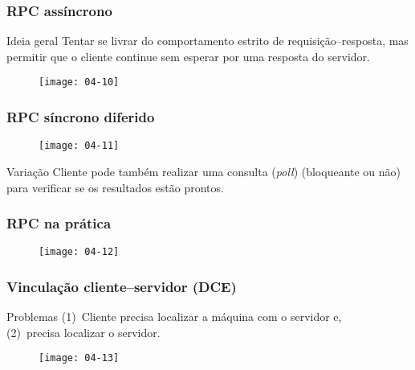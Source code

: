 \documentclass[Ligatures=TeX,table,brazil,svgnames,usetotalslideindicator,compress,10pt]{beamer}
\begin{document}
\begin{frame}
  \frametitle{RPC assíncrono}
  \begin{block}{Ideia geral}
    Tentar se livrar do comportamento estrito de requisição--resposta, mas permitir que o cliente continue sem esperar por uma resposta do servidor.
  \end{block}

  \begin{figure}
    \centering
    \texttt{[image: 04-10]}
  \end{figure}

\end{frame}

\begin{frame}
  \frametitle{RPC síncrono diferido}
  \begin{figure}
    \centering
    \texttt{[image: 04-11]}
  \end{figure}

  \begin{block}{Variação}
    Cliente pode também realizar uma consulta (\textit{poll}) (bloqueante ou não) para verificar se os resultados estão prontos.
  \end{block}

\end{frame}

\begin{frame}
  \frametitle{RPC na prática}
  \begin{figure}
    \centering
    \texttt{[image: 04-12]}
  \end{figure}


\end{frame}

\begin{frame}
  \frametitle{Vinculação cliente--servidor (DCE)}

  \begin{block}{Problemas}
    (1)~Cliente precisa localizar a máquina com o servidor e,\\
    (2)~precisa localizar o servidor.
  \end{block}

  \begin{figure}
    \centering
    \texttt{[image: 04-13]}
  \end{figure}

\end{frame}
\end{document}
